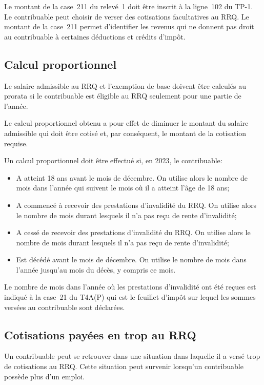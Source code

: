 Le montant de la case~211 du relevé~1 doit être inscrit à la ligne~102 du TP-1. Le contribuable peut choisir de verser des cotisations facultatives au RRQ. Le montant de la case~211 permet d'identifier les revenus qui ne donnent pas droit au contribuable à certaines déductions et crédits d'impôt.

\subsection{Calcul proportionnel}
Le salaire admissible au RRQ et l'exemption de base doivent être calculés au prorata si le contribuable est éligible au RRQ seulement pour une partie de l'année. 

Le calcul proportionnel obtenu a pour effet de diminuer le montant du salaire admissible qui doit être cotisé et, par conséquent, le montant de la cotisation requise.

Un calcul proportionnel doit être effectué si, en 2023, le contribuable:
\begin{itemize}
	\item A atteint 18 ans avant le mois de décembre. On utilise alors le nombre de mois dans l'année qui suivent le mois où il a atteint l'âge de 18 ans; 
	\item A commencé à recevoir des prestations d'invalidité du RRQ. On utilise alors le nombre de mois durant lesquels il n'a pas reçu de rente d'invalidité; 
	\item A cessé de recevoir des prestations d'invalidité du RRQ. On utilise alors le nombre de mois durant lesquels il n'a pas reçu de rente d'invalidité; 
	\item Est décédé avant le mois de décembre. On utilise le nombre de mois dans l'année jusqu'au mois du décès, y compris ce mois.
\end{itemize}

\begin{note}
	Le nombre de mois dans l'année où les prestations d'invalidité ont été reçues est indiqué à la case~21 du T4A(P) qui est le feuillet d'impôt sur lequel les sommes versées au contribuable sont déclarées.
\end{note}

\subsection{Cotisations payées en trop au RRQ}
Un contribuable peut se retrouver dans une situation dans laquelle il a versé trop de cotisations au RRQ. Cette situation peut survenir lorsqu'un contribuable possède plus d'un emploi.

